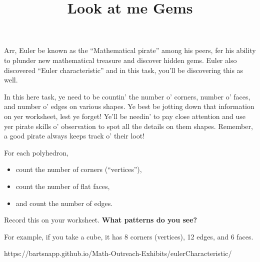 \documentclass{../exhibit}
\title{Look at me Gems}
\begin{document}
\begin{context} Arr, Euler be known as the ``Mathematical pirate''
among his peers, fer his ability to plunder new mathematical treasure
and discover hidden gems.  Euler also discovered ``Euler
characteristic'' and in this task, you'll be discovering this as well.

In this here task, ye need to be countin' the number o' corners,
number o' faces, and number o' edges on various shapes. Ye best be
jotting down that information on yer worksheet, lest ye forget! Ye'll
be needin' to pay close attention and use yer pirate skills o'
observation to spot all the details on them shapes. Remember, a good
pirate always keeps track o' their loot!
\end{context}


\begin{directions}
  For each polyhedron,
  \begin{itemize}
  \item count the number of corners (``vertices''),
  \item count the number of flat faces,
  \item and count the number of edges.
  \end{itemize}
  Record this on your worksheet.  \textbf{What patterns do you see?}
\end{directions}



\begin{example}

For example, if you take a cube, it has 8 corners (vertices), 12 edges, and 6 faces.
\end{example}



\begin{mathConnections}
  https://bartsnapp.github.io/Math-Outreach-Exhibits/eulerCharacteristic/
\end{mathConnections}
\end{document}
